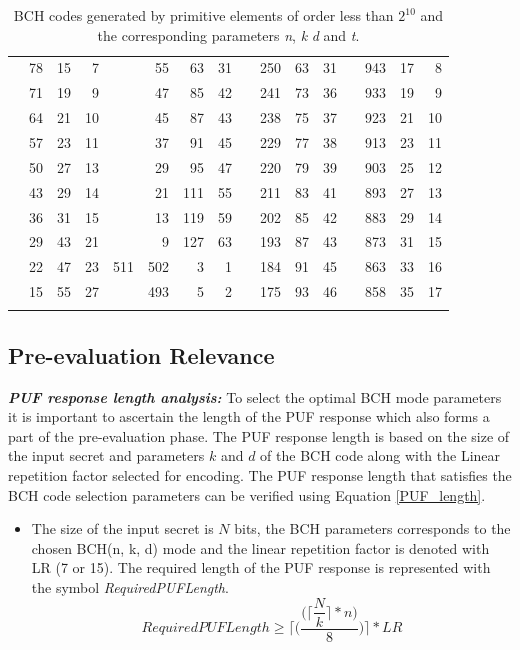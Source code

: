 \begin{table}[!ht]
\begin{center}
\begin{tabular}{rrrr|rrrr|rrrr|rrrr}
&78&15&7&&55&63&31&&250&63&31&&943&17&8\\
&71&19&9&&47&85&42&&241&73&36&&933&19&9\\
&64&21&10&&45&87&43&&238&75&37&&923&21&10\\
&57&23&11&&37&91&45&&229&77&38&&913&23&11\\
&50&27&13&&29&95&47&&220&79&39&&903&25&12\\
&43&29&14&&21&111&55&&211&83&41&&893&27&13\\
&36&31&15&&13&119&59&&202&85&42&&883&29&14\\
&29&43&21&&9&127&63&&193&87&43&&873&31&15\\
&22&47&23&511&502&3&1&&184&91&45&&863&33&16\\
&15&55&27&&493&5&2&&175&93&46&&858&35&17\\
\hline
\addlinespace
\bottomrule
\end{tabular}
\end{center}
\caption{BCH codes generated by primitive elements of order less than $2^{10}$ and the corresponding parameters \emph{n}, \emph{k} \emph{d} and \emph{t}.}
\label{tab:BCHmodes}
\end{table}

\subsection{Pre-evaluation Relevance}
\emph{\textbf{PUF response length analysis:}} To select the optimal BCH mode parameters it is important to ascertain the length of the PUF response which also forms a part of the pre-evaluation phase. The PUF response length is based on the size of the input secret and parameters $k$ and $d$ of the BCH code along with the Linear repetition factor selected for encoding. The PUF response length that satisfies the BCH code selection parameters can be verified using Equation
		\ref{PUF_length}.
\begin{itemize}
	\item The size of the input secret is $N$ bits, the BCH parameters corresponds to the chosen BCH(n, k, d) mode and the linear repetition factor is denoted with LR (7 or 15). The required length of the PUF response is represented with the symbol \emph{RequiredPUFLength}\cite{71}.\\
		\begin{equation}
			RequiredPUFLength \geq \Bigg\lceil\Bigg(\dfrac{\Bigg(\Bigg\lceil\dfrac{N}{k}\Bigg\rceil
		* n\Bigg)}{8}\Bigg)\Bigg\rceil * LR
		\label{PUF_length}
		\end{equation}
\end{itemize}

